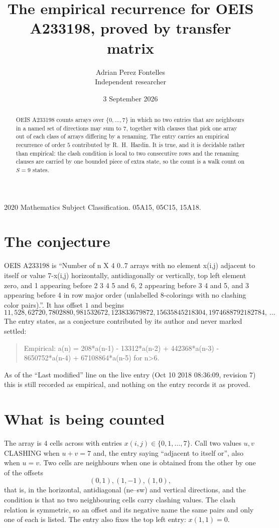\documentclass[11pt,a4paper]{article}
\title{The empirical recurrence for OEIS A233198, proved by transfer matrix}
\author{Adrian Perez Fontelles\\ \small Independent researcher}
\date{3 September 2026}
\theoremstyle{plain}
\theoremstyle{definition}
\begin{document}
\maketitle

\begin{abstract}
OEIS A233198 counts arrays over $\{0,\dots,7\}$ in which no two entries that are neighbours in
a named set of directions may sum to $7$, together with clauses that pick one array out of
each class of arrays differing by a renaming. The entry carries an empirical recurrence of
order $5$ contributed by R.~H.~Hardin. It is true, and it is decidable rather than
empirical: the clash condition is local to two consecutive rows and the renaming clauses are
carried by one bounded piece of extra state, so the count is a walk count on $S=9$ states.
\end{abstract}

\noindent\small 2020 Mathematics Subject Classification. 05A15, 05C15, 15A18.\normalsize

\section{The conjecture}

OEIS A233198 is ``Number of n X 4 0..7 arrays with no element x(i,j) adjacent to itself or value 7-x(i,j) horizontally, antidiagonally or vertically, top left element zero, and 1 appearing before 2 3 4 5 and 6, 2 appearing before 3 4 and 5, and 3 appearing before 4 in row major order (unlabelled 8-colorings with no clashing color pairs).''. It has offset $1$ and begins
\[
11, 528, 62720, 7802880, 981532672, 123833679872, 15635845218304, 1974688792182784,\ \dots
\]
The entry states, as a conjecture contributed by its author and never marked settled:
\begin{quote}
Empirical: a(n) = 208*a(n-1) - 13312*a(n-2) + 442368*a(n-3) - 8650752*a(n-4) + 67108864*a(n-5) for n>6.
\end{quote}
As of the ``Last modified'' line on the live entry (Oct 10 2018 08:36:09, revision 7) this is still
recorded as empirical, and nothing on the entry records it as proved.

\section{What is being counted}

The array is $4$ cells across with entries $x(i,j)\in\{0,1,\dots,7\}$. Call two values $u,v$ CLASHING
when $u+v=7$ and, the entry saying ``adjacent to itself or'', also when $u=v$. Two cells are neighbours when one is obtained from the other by one of
the offsets
\[
(0,1), (1,-1), (1,0),
\]
that is, in the horizontal, antidiagonal (ne--sw) and vertical directions, and the condition is that no two neighbouring cells carry
clashing values. The clash relation is symmetric, so an offset and its negative name the
same pairs and only one of each is listed. The entry also fixes the top left entry: $x(1,1)=0$.
\end{document}
